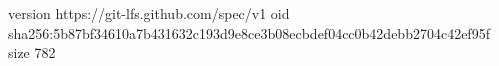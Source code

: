 version https://git-lfs.github.com/spec/v1
oid sha256:5b87bf34610a7b431632c193d9e8ce3b08ecbdef04cc0b42debb2704c42ef95f
size 782

